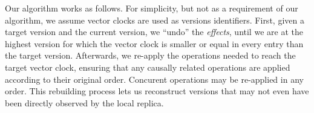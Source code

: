 Our algorithm works as follows.
For simplicity, but not as a requirement of our algorithm, we assume vector clocks are used as versions identifiers.
First, given a target version and the current version, we ``undo'' the \emph{effects}, until we are at the highest version for which the vector clock is smaller or equal in every entry than the target version.
Afterwards, we re-apply the operations needed to reach the target vector clock, ensuring that any causally related operations are applied according to their original order.
Concurent operations may be re-applied in any order.
This rebuilding process lets us reconstruct versions that may not even have been directly observed by the local replica. 


